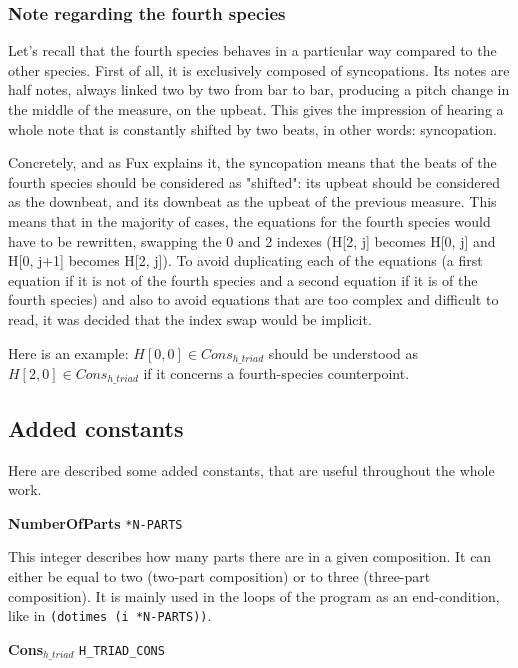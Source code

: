 \subsubsection{Note regarding the fourth species}\label{nota-bene-4th-species} Let's recall that the fourth species behaves in a particular way compared to the other species. First of all, it is exclusively composed of syncopations. Its notes are half notes, always linked two by two from bar to bar, producing a pitch change in the middle of the measure, on the upbeat. This gives the impression of hearing a whole note that is constantly shifted by two beats, in other words: syncopation.

Concretely, and as Fux explains it, the syncopation means that the beats of the fourth species should be considered as "shifted": its upbeat should be considered as the downbeat, and its downbeat as the upbeat of the previous measure. This means that in the majority of cases, the equations for the fourth species would have to be rewritten, swapping the 0 and 2 indexes (H[2, j] becomes H[0, j] and H[0, j+1] becomes H[2, j]). To avoid duplicating each of the equations (a first equation if it is not of the fourth species and a second equation if it is of the fourth species) and also to avoid equations that are too complex and difficult to read, it was decided that the index swap would be implicit.

Here is an example: $H[0, 0] \in Cons_{h\_triad}$ should be understood as $H[2, 0] \in Cons_{h\_triad}$ if it concerns a fourth-species counterpoint.

\subsection{Added constants}
Here are described some added constants, that are useful throughout the whole work.

\vspace{.5cm} \noindent \textbf{NumberOfParts} \hspace{.2cm} \texttt{*N-PARTS}

This integer describes how many parts there are in a given composition. It can either be equal to two (two-part composition) or to three (three-part composition). It is mainly used in the loops of the program as an end-condition, like in \texttt{(dotimes (i *N-PARTS))}.

\vspace{.5cm} \noindent \textbf{Cons$_{h\_triad}$} \hspace{.2cm} \texttt{H\_TRIAD\_CONS}

